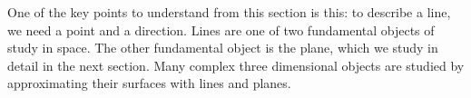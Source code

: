 %
%
%
%
%

One of the key points to understand from this section is this: to describe a line, we need a point and a direction. Lines are one of two fundamental objects of study in space. The other fundamental object is the plane, which we study in detail in the next section. Many complex three dimensional objects are studied by approximating their surfaces with lines and planes.


